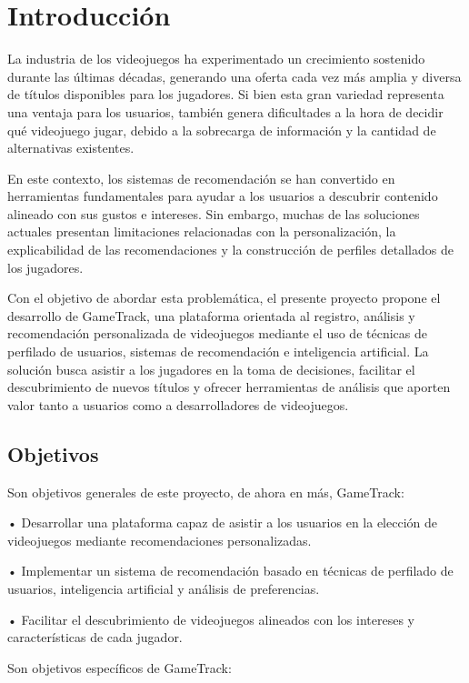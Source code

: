 \chapter{Introducción}\label{chapter:introduccion}

La industria de los videojuegos ha experimentado un crecimiento sostenido durante las últimas décadas, generando una oferta cada vez más amplia y diversa de títulos disponibles para los jugadores. Si bien esta gran variedad representa una ventaja para los usuarios, también genera dificultades a la hora de decidir qué videojuego jugar, debido a la sobrecarga de información y la cantidad de alternativas existentes.

En este contexto, los sistemas de recomendación se han convertido en herramientas fundamentales para ayudar a los usuarios a descubrir contenido alineado con sus gustos e intereses. Sin embargo, muchas de las soluciones actuales presentan limitaciones relacionadas con la personalización, la explicabilidad de las recomendaciones y la construcción de perfiles detallados de los jugadores.

Con el objetivo de abordar esta problemática, el presente proyecto propone el desarrollo de GameTrack, una plataforma orientada al registro, análisis y recomendación personalizada de videojuegos mediante el uso de técnicas de perfilado de usuarios, sistemas de recomendación e inteligencia artificial. La solución busca asistir a los jugadores en la toma de decisiones, facilitar el descubrimiento de nuevos títulos y ofrecer herramientas de análisis que aporten valor tanto a usuarios como a desarrolladores de videojuegos.

\section{Objetivos}\label{sec:objetivos}

Son objetivos generales de este proyecto, de ahora en más, GameTrack:

• Desarrollar una plataforma capaz de asistir a los usuarios en la elección de videojuegos mediante recomendaciones personalizadas.

• Implementar un sistema de recomendación basado en técnicas de perfilado de usuarios, inteligencia artificial y análisis de preferencias.

• Facilitar el descubrimiento de videojuegos alineados con los intereses y características de cada jugador.

Son objetivos específicos de GameTrack:

